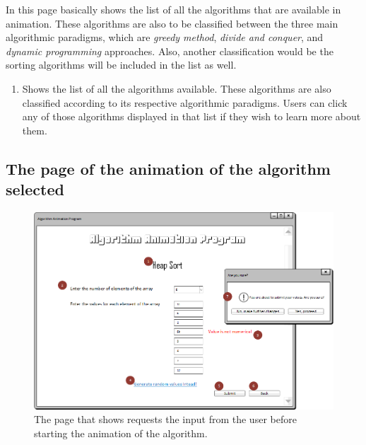 In this page basically shows the list of all the algorithms that are available in animation. These algorithms are also to be classified between the three main algorithmic paradigms, which are \textit{greedy method}, \textit{divide and conquer}, and \textit{dynamic programming} approaches. Also, another classification would be the sorting algorithms will be included in the list as well.

\begin{enumerate}
\item Shows the list of all the algorithms available. These algorithms are also classified according to its respective algorithmic paradigms. Users can click any of those algorithms displayed in that list if they wish to learn more about them.
\end{enumerate}

\subsection{The page of the animation of the algorithm selected}

\begin{figure}[H]
\centering
\hspace*{-0.5cm}
\includegraphics[scale=0.7]{images/report_images/uiInputAnimation.png}
\caption{The page that shows requests the input from the user before starting the animation of the algorithm.}
\label{uiInputAnimation}
\end{figure}

